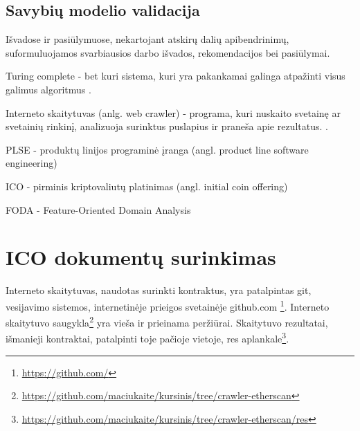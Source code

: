 \documentclass{VUMIFPSkursinis}
\begin{document}
\subsection{Savybių modelio validacija} \label{validacija}








Išvadose ir pasiūlymuose, nekartojant atskirų dalių apibendrinimų,
suformuluojamos svarbiausios darbo išvados, rekomendacijos bei pasiūlymai.



\printbibliography[heading=bibintoc] %

Turing complete - bet kuri sistema, kuri yra pakankamai galinga atpažinti visus galimus algoritmus \cite{Teller1994}. 

Interneto skaitytuvas (anlg. web crawler) -  programa, kuri nuskaito svetainę ar svetainių rinkinį, analizuoja surinktus puslapius ir praneša apie rezultatus. \cite{Thelwall2001}.

PLSE - produktų linijos programinė įranga (angl. product line software engineering)

ICO - pirminis kriptovaliutų platinimas (angl. initial coin offering)

FODA - Feature-Oriented Domain Analysis \cite{Kang1990}

\pagebreak

 \appendix   
%

\section {ICO dokumentų surinkimas}

Interneto skaitytuvas, naudotas surinkti kontraktus, yra patalpintas git, vesijavimo sistemos, internetinėje prieigos svetainėje github.com \footnote{\url {https://github.com/}}. Interneto skaitytuvo saugykla\footnote{\url{https://github.com/maciukaite/kursinis/tree/crawler-etherscan}} yra vieša ir prieinama peržiūrai. Skaitytuvo rezultatai, išmanieji kontraktai, patalpinti toje pačioje vietoje, res aplankale\footnote{\url{https://github.com/maciukaite/kursinis/tree/crawler-etherscan/res}}.
\end{document}
